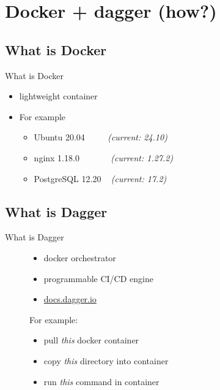 \documentclass{beamer}
\begin{document}

\section{Docker + dagger (how?)}

\subsection{What is Docker}
\begin{frame}{What is Docker}
	\begin{itemize}
	\item{lightweight container}
	\item{For example}
		\begin{itemize}
		\item{Ubuntu 20.04 ~~~~ \textit{(current: 24.10)}}
		\item{nginx 1.18.0 ~~~~~~ \textit{(current: 1.27.2)}}
		\item{PostgreSQL 12.20 ~ \textit{(current: 17.2)}}
		\end{itemize}
	\end{itemize}
\end{frame}

\subsection{What is Dagger}
\begin{frame}{What is Dagger}
	\begin{figure}
	\centering
	\begin{minipage}{.5\textwidth}
		\begin{itemize}
		\item{docker orchestrator}
		\item{programmable CI/CD engine}
		\item{\url{docs.dagger.io}}
		\end{itemize}
	\end{minipage}%
	\begin{minipage}{.5\textwidth}
		For example:
		\begin{itemize}
		\item{pull \textit{this} docker container}
		\item{copy \textit{this} directory into container}
		\item{run \textit{this} command in container}
		\end{itemize}
	\end{minipage}
	\end{figure}
\end{frame}
\end{document}
